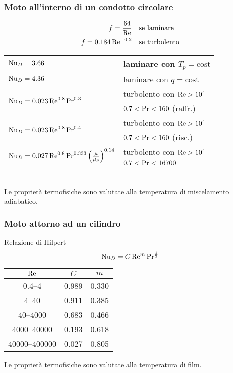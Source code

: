 \subsubsection{Moto all'interno di un condotto circolare}
\begin{align*}
    f = \frac{64}{\operatorname{Re}} & \quad \text{se laminare} \\
    f = 0.184 \operatorname{Re}^{-0.2} & \quad \text{se turbolento}\\
\end{align*}
\begin{tabular}{ll}
    \toprule
    $\operatorname{Nu}_{D} = 3.66$ & laminare con $T_p = \text{cost}$ \\
    \midrule
    $\operatorname{Nu}_{D} = 4.36$ & laminare con $\dot{q} = \text{cost}$ \\
    \midrule
    \multirow{2}{*}{$\operatorname{Nu}_{D} = 0.023 \operatorname{Re}^{0.8} \operatorname{Pr}^{0.3}$} & turbolento con $\operatorname{Re} > 10^4$ \\
    & $0.7 < \operatorname{Pr} < 160$ (raffr.)\\
    \midrule
    \multirow{2}{*}{$\operatorname{Nu}_{D} = 0.023 \operatorname{Re}^{0.8} \operatorname{Pr}^{0.4}$} & turbolento con $\operatorname{Re} > 10^4$ \\
    & $0.7 < \operatorname{Pr} < 160$ (risc.)\\
    \midrule
    \multirow{2}{*}{$\operatorname{Nu}_{D} = 0.027 \operatorname{Re}^{0.8} \operatorname{Pr}^{0.333} \qty(\frac{\mu}{\mu_p})^{0.14}$} & turbolento con $\operatorname{Re} > 10^4$ \\
    & $0.7 < \operatorname{Pr} < 16700$\\
    \midrule
\end{tabular}\\
Le proprietà termofisiche sono valutate alla temperatura di miscelamento adiabatico.

\subsubsection{Moto attorno ad un cilindro}
Relazione di Hilpert
\[ \operatorname{Nu}_{D} = C \operatorname{Re}^m \operatorname{Pr}^{\frac{1}{3}} \]
\begin{center}
\begin{tabular}{ccc}
    \toprule
    $\operatorname{Re}$ & $C$ & $m$ \\ \midrule
    \numrange{0.4}{4} & 0.989 & 0.330 \\
    \numrange{4}{40} & 0.911 & 0.385 \\
    \numrange{40}{4000} & 0.683 & 0.466 \\
    \numrange{4000}{40000} & 0.193 & 0.618 \\
    \numrange{40000}{400000} & 0.027 & 0.805 \\
    \bottomrule
\end{tabular}
\end{center}
Le proprietà termofisiche sono valutate alla temperatura di film.

